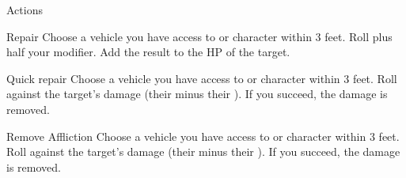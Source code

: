 
\begin{abstractsection}{Actions}

\begin{describe}{Repair}
  Choose a vehicle you have access to or character within 3 feet. Roll  plus half your  modifier. Add the result to the HP of the target.
\end{describe}

\begin{describe}{Quick repair}
  Choose a vehicle you have access to or character within 3 feet. Roll  against the target's damage (their  minus their ). If you succeed, the damage is removed.
\end{describe}

\begin{describe}{Remove Affliction}
  Choose a vehicle you have access to or character within 3 feet. Roll  against the target's damage (their  minus their ). If you succeed, the damage is removed.
\end{describe}

\end{abstractsection}
